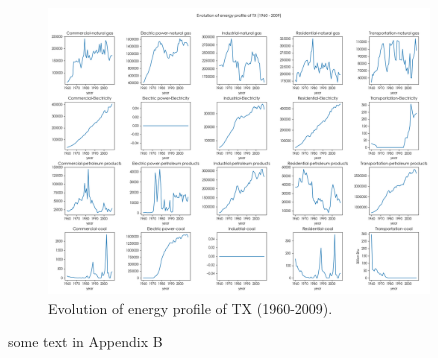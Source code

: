 \documentclass[a4paper,11pt]{article}
\begin{document}
\begin{appendices}
\begin{figure}[h]%
    \centering 
    \includegraphics[width=0.9\textwidth]{./Pic/part-2-TX.png}
    \caption{Evolution of energy profile of TX (1960-2009).}
    \label{fig:part-2-TX}  
\end{figure}
    some text in Appendix B  
\end{appendices}  
\end{document}

